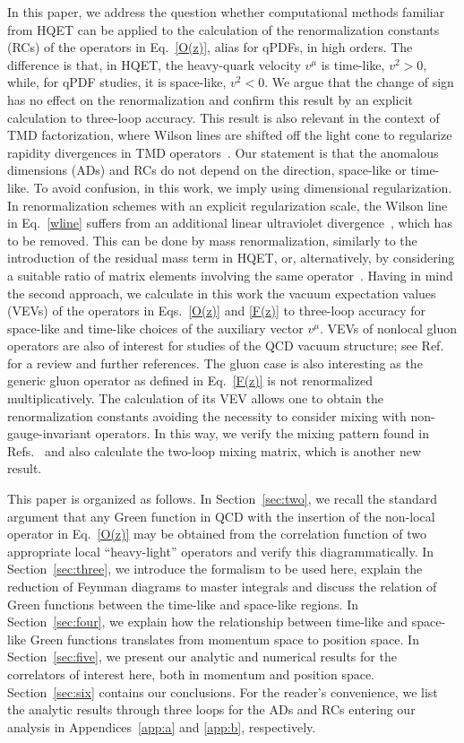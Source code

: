 \documentclass[12pt]{article}
\numberwithin{equation}{section}
\newcommand{\1}[1]{\mathbf{1}^{#1}}
\newcommand{\2}[1]{\mathbf{2}^{#1}}
\newcommand{\3}[1]{\mathbf{3}^{#1}}
\newcommand{\4}[1]{\mathbf{4}^{#1}}
\newcommand{\5}[1]{\mathbf{5}^{#1}}
\newcommand{\vv}{v^2}
\begin{document}
In this paper, we address the question whether computational methods familiar
from HQET can be applied to the calculation of the renormalization constants
(RCs) of the operators in Eq.~\eqref{O(z)}, alias for qPDFs, in high
orders. The difference is that, in HQET, the heavy-quark velocity $v^\mu$ is
time-like, $\vv>0$, while, for qPDF studies, it is space-like, $\vv <0$.  We
argue that the change of sign has no effect on the renormalization and confirm
this result by an explicit calculation to three-loop accuracy. This result is
also relevant in the context of TMD factorization, where Wilson lines are
shifted off the light cone to regularize rapidity divergences in TMD
operators~\cite{Collins:2011zzd}. Our statement is that the anomalous
dimensions (ADs) and RCs do not depend on the direction, space-like or
time-like.
To avoid confusion, in this work, we imply using dimensional regularization.
In renormalization schemes with an explicit regularization scale, the Wilson
line in Eq.~\eqref{wline} suffers from an additional linear ultraviolet
divergence~\cite{Polyakov:1980ca}, which has to be removed.  This can be done
by mass renormalization, similarly to the introduction of the residual mass
term in HQET, or, alternatively, by considering a suitable ratio of matrix
elements involving the same
operator~\cite{Orginos:2017kos,Braun:2018brg}. Having in mind the second
approach, we calculate in this work the vacuum expectation values (VEVs) of
the operators in Eqs.~\eqref{O(z)} and \eqref{F(z)} to three-loop accuracy
for space-like and time-like choices of the auxiliary vector $v^\mu$.  VEVs of
nonlocal gluon operators are also of interest for studies of the QCD vacuum
structure; see Ref.~\cite{DiGiacomo:2000irz} for a review and further references.
The gluon case is also interesting as the generic gluon operator as defined in
Eq.~\eqref{F(z)} is not renormalized multiplicatively.  The calculation of its VEV
allows one to obtain the renormalization constants avoiding the necessity to
consider mixing with non-gauge-invariant operators. In this way, we verify the
mixing pattern found in Refs.~\cite{Dorn:1980hs,Dorn:1981wa} and also calculate the two-loop
mixing matrix, which is another new result.

This paper is organized as follows.
In Section~\ref{sec:two}, we recall the standard argument that any Green function in QCD with the
insertion of the non-local operator in Eq.~\eqref{O(z)} may be obtained from the
correlation function of two appropriate local ``heavy-light'' operators and
verify this diagrammatically.
In Section~\ref{sec:three}, we introduce the formalism to be used here, explain
the reduction of Feynman diagrams to master integrals and discuss the relation
of Green functions between the time-like and space-like regions.
In Section~\ref{sec:four}, we explain how the relationship between time-like
and space-like Green functions translates from momentum space to position
space.
In Section~\ref{sec:five}, we present our analytic and numerical results for
the correlators of interest here, both in momentum and position space.
Section~\ref{sec:six} contains our conclusions.
For the reader's convenience, we list the analytic results through three loops
for the ADs and RCs entering our analysis in Appendices~\ref{app:a} and
\ref{app:b}, respectively.
\end{document}

